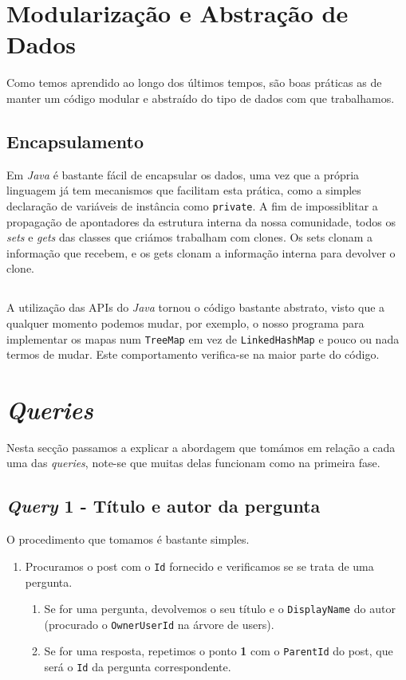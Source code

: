 \documentclass[10pt]{article}
\begin{document}
	
	
\pagebreak

\section{Modularização e Abstração de Dados}
		Como temos aprendido ao longo dos últimos tempos, são boas práticas as de 
	manter um código modular e abstraído do tipo de dados com que	trabalhamos.
	
	\subsection*{Encapsulamento}
	
		Em \textit{Java} é bastante fácil de encapsular os dados, 
	uma vez que a própria linguagem já tem mecanismos que facilitam 
	esta prática, como a simples declaração de variáveis de instância 
	como \texttt{private}. A fim de impossiblitar a propagação de 
	apontadores da estrutura interna da nossa comunidade, todos os
	\textit{sets} e \textit{gets} das classes que criámos trabalham 
	com clones. Os sets clonam a informação que recebem, e os gets 
	clonam a informação interna para devolver o clone.
	
	
	
	
	\subsection*{}
		A utilização das APIs do \textit{Java} tornou o código 
	bastante abstrato, visto que a qualquer momento podemos mudar, 
	por exemplo, o nosso programa para implementar os mapas num 
	\texttt{TreeMap} em vez de \texttt{LinkedHashMap} e pouco ou 
	nada termos de mudar. Este comportamento verifica-se na maior 
	parte do código.

\section{\textit{Queries}}
		Nesta secção passamos a explicar a abordagem que tomámos 
	em relação a cada uma das \textit{queries}, note-se que muitas 
	delas funcionam como na primeira fase.
	\subsection*{\textit{Query} 1 - Título e autor da pergunta}
		O procedimento que tomamos é bastante simples. 
		\begin{enumerate}
		\item Procuramos o post com o \texttt{Id} fornecido e verificamos se se trata
		 de uma pergunta. 
		\begin{enumerate}
		\item Se for uma pergunta, devolvemos o seu título e o \texttt{DisplayName} do autor 
	(procurado o \texttt{OwnerUserId} na árvore de users).
	
		\item Se for uma resposta, repetimos o ponto \textbf{1} com o \texttt{ParentId}
		do post, que será o \texttt{Id} da pergunta correspondente.
		\end{enumerate}
		\end{enumerate}
\end{document}
